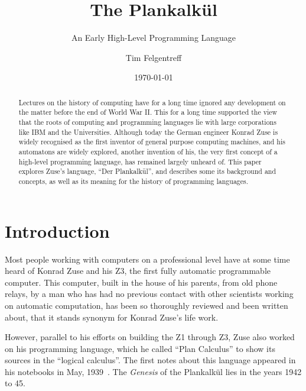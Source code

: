 \documentclass{llncs}
\begin{document}
\pagestyle{headings}  %
\mainmatter %
\title{The Plankalkül}
\subtitle{An Early High-Level Programming Language}
\author{Tim Felgentreff}
\date{\today}

\maketitle
\begin{abstract}
   Lectures on the history of computing have for a long time 
   ignored any development on the matter before the end of World War II. 
   This for a long time supported the view that the roots of 
   computing and programming languages lie with large corporations 
   like IBM and the Universities.
   Although today
   the German engineer Konrad Zuse is widely recognised
   as the first inventor of general purpose computing machines, 
   and his automatons are widely explored, another invention of 
   his, the very first concept of a 
   high-level programming language, has remained largely unheard of.
   This paper explores Zuse's language, ``Der Plankalkül'', 
   and describes some its background and concepts, as well as its 
   meaning for the history of programming languages.
\end{abstract}
 \section{Introduction}
   Most people working with computers on a professional level have
   at some time heard of Konrad Zuse and his Z3, the first fully 
   automatic programmable computer. This computer, built in the 
   house of his parents, from old phone relays, by a man who has had no 
   previous contact with other scientists working on automatic computation, 
   has been so thoroughly reviewed and been written about, that it 
   stands synonym for Konrad Zuse's life work.

   However, parallel to his efforts on building the Z1 through Z3, Zuse
   also worked on his programming language, which he called ``Plan Calculus''
   to show its sources in the ``logical calculus''. The first notes about
   this language appeared in his notebooks in May, 1939~\cite{rojas2002konrad}. The \emph{Genesis}
   of the Plankalkül lies in the years 1942 to 45.
\end{document}
